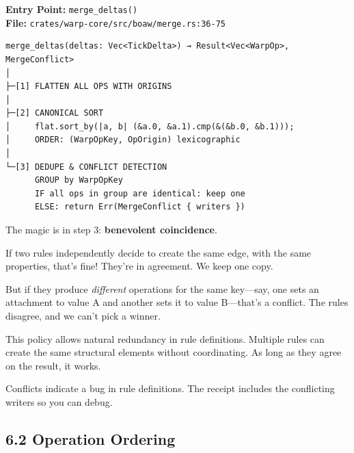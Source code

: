 \documentclass[11pt]{book}
\newenvironment{directors}
{\begin{mdframed}[
  linecolor=blue!60,
  linewidth=2pt,
  leftline=true,
  rightline=false,
  topline=false,
  bottomline=false,
  backgroundcolor=blue!3,
  innerleftmargin=12pt,
  innerrightmargin=10pt,
  innertopmargin=8pt,
  innerbottommargin=8pt,
  skipabove=12pt,
  skipbelow=12pt
]\small\sffamily\color{blue!70!black}}
{\end{mdframed}}
\begin{document}
\textbf{Entry Point:} \texttt{merge\_deltas()} \\
\textbf{File:} \texttt{crates/warp-core/src/boaw/merge.rs:36-75}

\begin{verbatim}
merge_deltas(deltas: Vec<TickDelta>) → Result<Vec<WarpOp>, MergeConflict>
│
├─[1] FLATTEN ALL OPS WITH ORIGINS
│
├─[2] CANONICAL SORT
│     flat.sort_by(|a, b| (&a.0, &a.1).cmp(&(&b.0, &b.1)));
│     ORDER: (WarpOpKey, OpOrigin) lexicographic
│
└─[3] DEDUPE & CONFLICT DETECTION
      GROUP by WarpOpKey
      IF all ops in group are identical: keep one
      ELSE: return Err(MergeConflict { writers })
\end{verbatim}

\begin{directors}
The magic is in step 3: \textbf{benevolent coincidence}.

If two rules independently decide to create the same edge, with the same properties, that's fine! They're in agreement. We keep one copy.

But if they produce \emph{different} operations for the same key---say, one sets an attachment to value A and another sets it to value B---that's a conflict. The rules disagree, and we can't pick a winner.

This policy allows natural redundancy in rule definitions. Multiple rules can create the same structural elements without coordinating. As long as they agree on the result, it works.

Conflicts indicate a bug in rule definitions. The receipt includes the conflicting writers so you can debug.
\end{directors}

\subsection{6.2 Operation Ordering}
\end{document}
